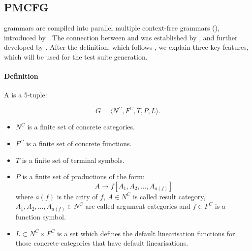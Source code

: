 \subsection{PMCFG}
\label{sec:PMCFG}

\gf{} grammars are compiled into parallel multiple context-free
grammars (\pmcfg), introduced by \citet{seki91pmcfg}. The
connection between \gf{} and \pmcfg{} was established by \citet{ljunglof2004}, and further developed by \citet{angelov2010phd}. 
After the definition, which follows \citet{angelov2010phd}, we
explain three key features, which will be used for the test suite generation.

\paragraph{Definition} A \pmcfg{} is a 5-tuple:

\[
 G = \langle N^C, F^C, T, P, L \rangle.
\]

\begin{itemize}
\item $N^C$ is a finite set of concrete categories.

\item $F^C$ is a finite set of concrete functions. %


\item $T$ is a finite set of terminal symbols.

\item $P$ is a finite set of productions of the form:
$$
A \rightarrow f[A_1,A_2,\dots,A_{a(f)}]
$$
where $a(f)$ is the arity of $f$, $A \in N^C$ is called result category, $A_1,A_2,\dots,A_{a(f)} \in N^C$ are called argument categories and $f \in F^C$ is a function symbol.
\item $L \subset N^C \times F^C$ is a set which defines the default linearisation functions for those concrete categories that have default linearisations. 
\end{itemize}



